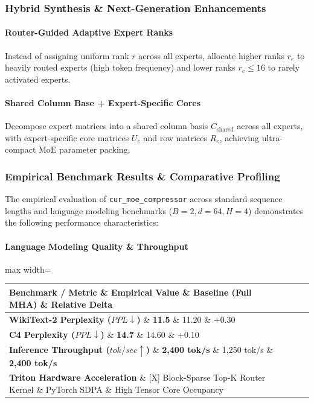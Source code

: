 \subsubsection*{Hybrid Synthesis \& Next-Generation Enhancements}

\paragraph{Router-Guided Adaptive Expert Ranks}
Instead of assigning uniform rank $r$ across all experts, allocate higher ranks $r_e$ to heavily routed experts (high token frequency) and lower ranks $r_e \le 16$ to rarely activated experts.

\paragraph{Shared Column Base + Expert-Specific Cores}
Decompose expert matrices into a shared column basis $C_{\text{shared}}$ across all experts, with expert-specific core matrices $U_e$ and row matrices $R_e$, achieving ultra-compact MoE parameter packing.

\subsubsection*{Empirical Benchmark Results \& Comparative Profiling}

The empirical evaluation of \texttt{cur\_moe\_compressor} across standard sequence lengths and language modeling benchmarks ($B=2, d=64, H=4$) demonstrates the following performance characteristics:

\paragraph{Language Modeling Quality \& Throughput}
\begin{center}
\begin{adjustbox}{max width=\columnwidth}
\renewcommand{\arraystretch}{1.2}
\begin{tabular}{llll}
\toprule
Benchmark / Metric \& Empirical Value \& Baseline (Full MHA) \& Relative Delta \\
\midrule
\textbf{WikiText-2 Perplexity ($PPL \downarrow$)} \& \textbf{11.5} \& 11.20 \& $+0.30$ \\
\textbf{C4 Perplexity ($PPL \downarrow$)} \& \textbf{14.7} \& 14.60 \& $+0.10$ \\
\textbf{Inference Throughput ($tok/sec \uparrow$)} \& \textbf{2,400 tok/s} \& 1,250 tok/s \& \textbf{2,400 tok/s} \\
\textbf{Triton Hardware Acceleration} \& [X] Block-Sparse Top-K Router Kernel \& PyTorch SDPA \& High Tensor Core Occupancy \\

\bottomrule
\end{tabular}
\end{adjustbox}
\end{center}
